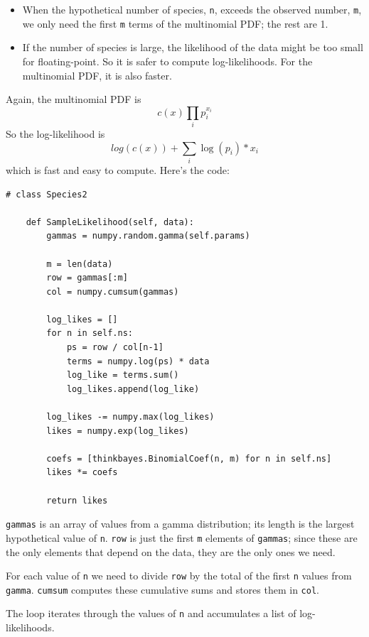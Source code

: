 \documentclass[12pt]{book}
\begin{document}
\begin{itemize}

\item When the hypothetical number of species, {\tt n},
exceeds the observed number, {\tt m}, we only need the first {\tt m}
terms of the multinomial PDF; the rest are 1.

\item If the number of species is large, the likelihood of the data
might be too small for floating-point.  So it is safer to compute
log-likelihoods.  For the multinomial PDF, it is also faster.

\end{itemize}

Again, the multinomial PDF is
%
\[ c(x) \prod_i p_i^{x_i}\]
%
So the log-likelihood is
%
\[ log(c(x)) + \sum_i \log(p_i) * x_i \]
%
which is fast and easy to compute.  Here's the code:

\begin{verbatim}
# class Species2

    def SampleLikelihood(self, data):
        gammas = numpy.random.gamma(self.params)

        m = len(data)
        row = gammas[:m]
        col = numpy.cumsum(gammas)

        log_likes = []
        for n in self.ns:
            ps = row / col[n-1]
            terms = numpy.log(ps) * data
            log_like = terms.sum()
            log_likes.append(log_like)

        log_likes -= numpy.max(log_likes)
        likes = numpy.exp(log_likes)

        coefs = [thinkbayes.BinomialCoef(n, m) for n in self.ns]
        likes *= coefs

        return likes
\end{verbatim}

{\tt gammas} is an array of values from a gamma distribution; its
length is the largest hypothetical value of {\tt n}.  {\tt row} is
just the first {\tt m} elements of {\tt gammas}; since these are the
only elements that depend on the data, they are the only ones we need.

For each value of {\tt n} we need to divide {\tt row} by the
total of the first {\tt n} values from {\tt gamma}.  {\tt cumsum}
computes these cumulative sums and stores them in {\tt col}.

The loop iterates through the values of {\tt n} and accumulates
a list of log-likelihoods.
\end{document}
